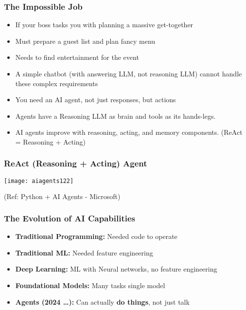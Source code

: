 \begin{frame}[fragile]\frametitle{The Impossible Job}
      \begin{itemize}
        \item If your boss tasks you with planning a massive get-together
        \item Must prepare a guest list and plan fancy menu 
        \item Needs to find entertainment for the event
        \item A simple chatbot (with answering LLM, not reasoning LLM) cannot handle these complex requirements
        \item You need an AI agent, not just responses, but actions
		\item Agents have a Reasoning LLM as brain and tools as its hands-legs.
        \item AI agents improve with reasoning, acting, and memory components. (ReAct = Reasoning + Acting)
      \end{itemize}
\end{frame}

\begin{frame}[fragile]\frametitle{ReAct (Reasoning + Acting) Agent}
		\begin{center}
		\texttt{[image: aiagents122]}
		
		{\tiny (Ref: Python + AI Agents - Microsoft)}
		\end{center}	
\end{frame}
\begin{frame}[fragile]\frametitle{The Evolution of AI Capabilities}
\begin{itemize}
    \item \textbf{Traditional Programming:} Needed code to operate
    \item \textbf{Traditional ML:} Needed feature engineering
    \item \textbf{Deep Learning:} ML with Neural networks, no feature engineering
    \item \textbf{Foundational Models:} Many tasks single model
    \item \textbf{Agents (2024 \ldots):} Can actually \textbf{do things}, not just talk
\end{itemize}
\end{frame}

